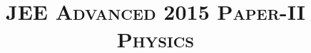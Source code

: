 \documentclass{article}
\title{\textsc{JEE Advanced 2015 Paper-II\\Physics}}
\date{}
\begin{document}
\maketitle
\begin{enumerate}
    
    
    
    
    
    
    
    
    
    
    
    
    
    
    
    
\end{enumerate}
\end{document}
